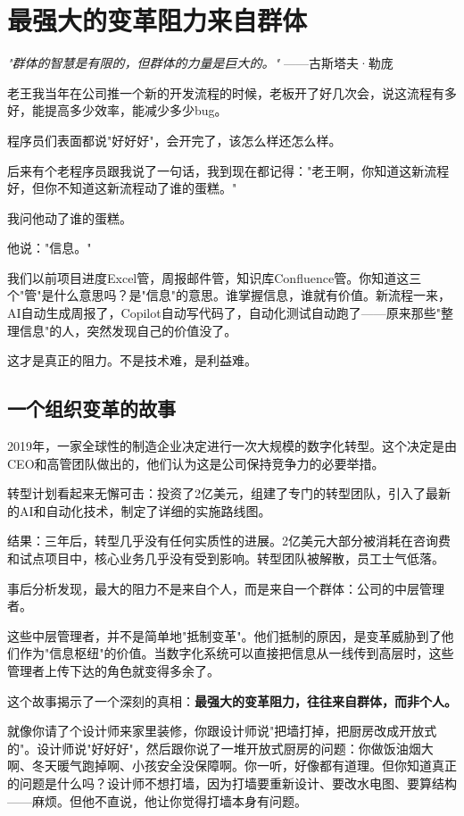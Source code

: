 \chapter{最强大的变革阻力来自群体}


\textit{"群体的智慧是有限的，但群体的力量是巨大的。"}
——古斯塔夫·勒庞


老王我当年在公司推一个新的开发流程的时候，老板开了好几次会，说这流程有多好，能提高多少效率，能减少多少bug。

程序员们表面都说"好好好"，会开完了，该怎么样还怎么样。

后来有个老程序员跟我说了一句话，我到现在都记得："老王啊，你知道这新流程好，但你不知道这新流程动了谁的蛋糕。"

我问他动了谁的蛋糕。

他说："信息。"

我们以前项目进度Excel管，周报邮件管，知识库Confluence管。你知道这三个"管"是什么意思吗？是"信息"的意思。谁掌握信息，谁就有价值。新流程一来，AI自动生成周报了，Copilot自动写代码了，自动化测试自动跑了——原来那些"整理信息"的人，突然发现自己的价值没了。

这才是真正的阻力。不是技术难，是利益难。

\section{一个组织变革的故事}


2019年，一家全球性的制造企业决定进行一次大规模的数字化转型。这个决定是由CEO和高管团队做出的，他们认为这是公司保持竞争力的必要举措。

转型计划看起来无懈可击：投资了2亿美元，组建了专门的转型团队，引入了最新的AI和自动化技术，制定了详细的实施路线图。

结果：三年后，转型几乎没有任何实质性的进展。2亿美元大部分被消耗在咨询费和试点项目中，核心业务几乎没有受到影响。转型团队被解散，员工士气低落。

事后分析发现，最大的阻力不是来自个人，而是来自一个群体：公司的中层管理者。

这些中层管理者，并不是简单地"抵制变革"。他们抵制的原因，是变革威胁到了他们作为"信息枢纽"的价值。当数字化系统可以直接把信息从一线传到高层时，这些管理者上传下达的角色就变得多余了。

这个故事揭示了一个深刻的真相：\textbf{最强大的变革阻力，往往来自群体，而非个人。}

就像你请了个设计师来家里装修，你跟设计师说"把墙打掉，把厨房改成开放式的"。设计师说"好好好"，然后跟你说了一堆开放式厨房的问题：你做饭油烟大啊、冬天暖气跑掉啊、小孩安全没保障啊。你一听，好像都有道理。但你知道真正的问题是什么吗？设计师不想打墙，因为打墙要重新设计、要改水电图、要算结构——麻烦。但他不直说，他让你觉得打墙本身有问题。

